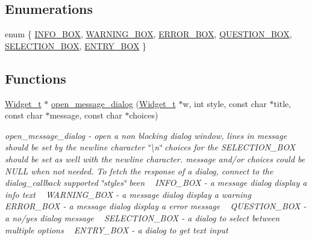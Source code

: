 \subsection*{Enumerations}
\begin{DoxyCompactItemize}
\item 
enum \{ \newline
\hyperlink{xmessage-dialog_8h_adf764cbdea00d65edcd07bb9953ad2b7affbd3707c912e33dec5b6d6d52de3889}{I\+N\+F\+O\+\_\+\+B\+OX}, 
\hyperlink{xmessage-dialog_8h_adf764cbdea00d65edcd07bb9953ad2b7a1b24044e8b852f37534374fc221b0b94}{W\+A\+R\+N\+I\+N\+G\+\_\+\+B\+OX}, 
\hyperlink{xmessage-dialog_8h_adf764cbdea00d65edcd07bb9953ad2b7aba33b2d56409150fdd0b80e849b235d7}{E\+R\+R\+O\+R\+\_\+\+B\+OX}, 
\hyperlink{xmessage-dialog_8h_adf764cbdea00d65edcd07bb9953ad2b7a0434869769df99b596e3c8bd2fc669ab}{Q\+U\+E\+S\+T\+I\+O\+N\+\_\+\+B\+OX}, 
\newline
\hyperlink{xmessage-dialog_8h_adf764cbdea00d65edcd07bb9953ad2b7a9b0235899180ac5e5c736b97b2f6baf4}{S\+E\+L\+E\+C\+T\+I\+O\+N\+\_\+\+B\+OX}, 
\hyperlink{xmessage-dialog_8h_adf764cbdea00d65edcd07bb9953ad2b7a8dde11ddd04976e94bff0bbe38851983}{E\+N\+T\+R\+Y\+\_\+\+B\+OX}
 \}
\end{DoxyCompactItemize}
\subsection*{Functions}
\begin{DoxyCompactItemize}
\item 
\hyperlink{structWidget__t}{Widget\+\_\+t} $\ast$ \hyperlink{xmessage-dialog_8h_a41a7ea2ce1732b9afbd1923f68b1d356}{open\+\_\+message\+\_\+dialog} (\hyperlink{structWidget__t}{Widget\+\_\+t} $\ast$w, int style, const char $\ast$title, const char $\ast$message, const char $\ast$choices)
\begin{DoxyCompactList}\small\item\em open\+\_\+message\+\_\+dialog -\/ open a non blocking dialog window, lines in message should be set by the newline character \char`\"{}\textbackslash{}n\char`\"{} choices for the S\+E\+L\+E\+C\+T\+I\+O\+N\+\_\+\+B\+OX should be set as well with the newline character. message and/or choices could be N\+U\+LL when not needed. To fetch the response of a dialog, connect to the dialog\+\_\+callback supported \char`\"{}styles\char`\"{} been ~\newline
I\+N\+F\+O\+\_\+\+B\+OX -\/ a message dialog display a info text ~\newline
W\+A\+R\+N\+I\+N\+G\+\_\+\+B\+OX -\/ a message dialog display a warning ~\newline
E\+R\+R\+O\+R\+\_\+\+B\+OX -\/ a message dialog display a error message ~\newline
Q\+U\+E\+S\+T\+I\+O\+N\+\_\+\+B\+OX -\/ a no/yes dialog message ~\newline
S\+E\+L\+E\+C\+T\+I\+O\+N\+\_\+\+B\+OX -\/ a dialog to select between multiple options ~\newline
E\+N\+T\+R\+Y\+\_\+\+B\+OX -\/ a dialog to get text input \end{DoxyCompactList}\end{DoxyCompactItemize}


